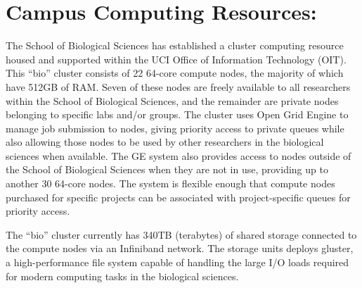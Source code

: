 \section*{Campus Computing Resources:}  The School of Biological Sciences has established a cluster computing resource housed and supported within the UCI Office of Information Technology (OIT).  This “bio” cluster consists of 22 64-core compute nodes, the majority of which have 512GB of RAM.  Seven of these nodes are freely available to all researchers within the School of Biological Sciences, and the remainder are private nodes belonging to specific labs and/or groups.  The cluster uses Open Grid Engine to manage job submission to nodes, giving priority access to private queues while also allowing those nodes to be used by other researchers in the biological sciences when available.  The GE system also provides access to nodes outside of the School of Biological Sciences when they are not in use, providing up to another 30 64-core nodes. The system is flexible enough that compute nodes purchased for specific projects can be associated with project-specific queues for priority access.

The “bio” cluster currently has 340TB (terabytes) of shared storage connected to the compute nodes via an Infiniband network.  The storage units deploys gluster, a high-performance file system capable of handling the large I/O loads required for modern computing tasks in the biological sciences.